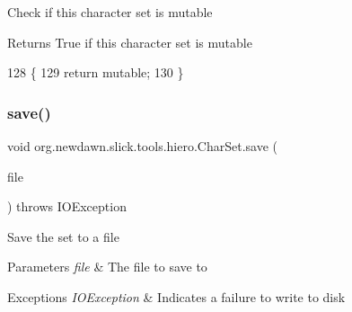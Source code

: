 Check if this character set is mutable

\begin{DoxyReturn}{Returns}
True if this character set is mutable 
\end{DoxyReturn}

\begin{DoxyCode}
128                                \{
129         \textcolor{keywordflow}{return} \textcolor{keyword}{mutable};
130     \}
\end{DoxyCode}
\mbox{\label{classorg_1_1newdawn_1_1slick_1_1tools_1_1hiero_1_1_char_set_aae2544c8a0cbe55ef54cfe6b1e21d60e}} 
\subsubsection{\texorpdfstring{save()}{save()}}
{\footnotesize\ttfamily void org.\+newdawn.\+slick.\+tools.\+hiero.\+Char\+Set.\+save (\begin{DoxyParamCaption}\item[{File}]{file }\end{DoxyParamCaption}) throws I\+O\+Exception\hspace{0.3cm}{\ttfamily [inline]}}

Save the set to a file


\begin{DoxyParams}{Parameters}
{\em file} & The file to save to\\
\hline
\end{DoxyParams}

\begin{DoxyExceptions}{Exceptions}
{\em I\+O\+Exception} & Indicates a failure to write to disk \\
\hline
\end{DoxyExceptions}

